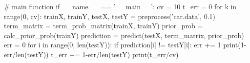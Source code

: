 \begin{mycode}
# main function
if __name__ == '__main__':
    cv = 10
    t_err = 0
    for k in range(0, cv):
        trainX, trainY, testX, testY = preprocess('car.data', 0.1)
        term_matrix = term_prob_matrix(trainX, trainY)
        prior_prob = calc_prior_prob(trainY)
        prediction = predict(testX, term_matrix, prior_prob)
        err = 0
        for i in range(0, len(testY)):
            if prediction[i] != testY[i]:
                err += 1
        print(1-err/len(testY))
        t_err += 1-err/len(testY)
    print(t_err/cv)
\end{mycode}

%
%
%
%
%
%



